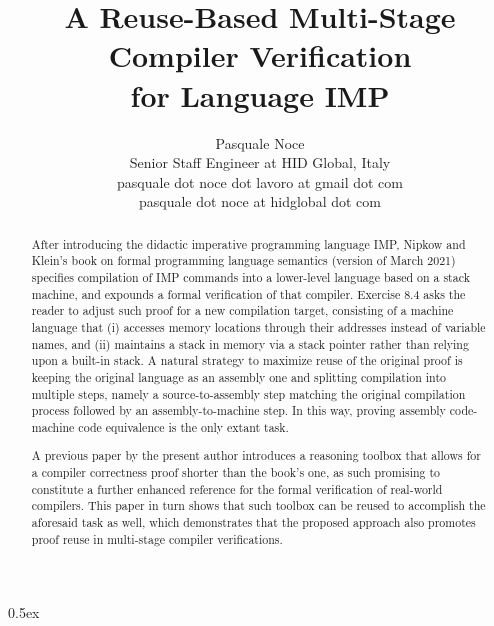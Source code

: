 \documentclass[11pt,a4paper,fleqn]{article}
\begin{document}
\title{A Reuse-Based Multi-Stage Compiler Verification\\for Language IMP}
\author{Pasquale Noce\\Senior Staff Engineer at HID Global, Italy\\pasquale dot noce dot lavoro at gmail dot com\\pasquale dot noce at hidglobal dot com}
\maketitle

\begin{abstract}
After introducing the didactic imperative programming language IMP, Nipkow and Klein's book on
formal programming language semantics (version of March 2021) specifies compilation of IMP commands
into a lower-level language based on a stack machine, and expounds a formal verification of that
compiler. Exercise 8.4 asks the reader to adjust such proof for a new compilation target, consisting
of a machine language that (i) accesses memory locations through their addresses instead of variable
names, and (ii) maintains a stack in memory via a stack pointer rather than relying upon a built-in
stack. A natural strategy to maximize reuse of the original proof is keeping the original language
as an assembly one and splitting compilation into multiple steps, namely a source-to-assembly step
matching the original compilation process followed by an assembly-to-machine step. In this way,
proving assembly code-machine code equivalence is the only extant task.

A previous paper by the present author introduces a reasoning toolbox that allows for a compiler
correctness proof shorter than the book's one, as such promising to constitute a further enhanced
reference for the formal verification of real-world compilers. This paper in turn shows that such
toolbox can be reused to accomplish the aforesaid task as well, which demonstrates that the proposed
approach also promotes proof reuse in multi-stage compiler verifications.
\end{abstract}

\tableofcontents

\parindent 0pt\parskip 0.5ex





\end{document}
